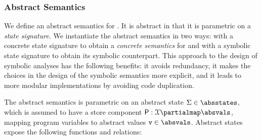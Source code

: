 \subsubsection{Abstract Semantics}
We define an abstract semantics for \jsil. It is abstract in that it is parametric on a \jsil \emph{state signature}. 
We instantiate the abstract semantics in two ways: with a concrete state signature to 
obtain a \emph{concrete semantics} for \jsil  and with a symbolic state signature to obtain its symbolic counterpart.
This approach to the design of symbolic analyses has the following benefits:  it avoids redundancy,
 it makes the choices in the design of the symbolic semantics more explicit, 
and  it leads to more modular implementations by avoiding code duplication.  


The abstract semantics is parametric on an abstract state $\absstate \in \absstates$, which is assumed to 
have a store component $\absstore: \jvars \partialmap \absvals$, mapping program variables to abstract 
values $\absval \in \absvals$. Abstract states expose the following functions and relations: 

